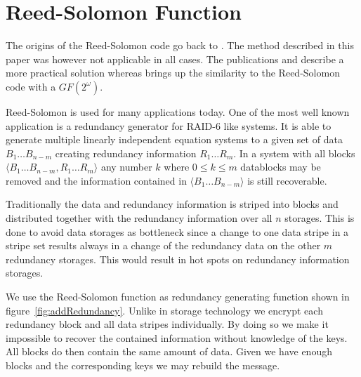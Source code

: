 \documentclass[9pt,journal,compsoc]{IEEEtran}
\begin{document}
%

\newpage
\appendices

\section{Reed-Solomon Function\label{sec:reedSolomon}}
The origins of the Reed-Solomon code go back to \cite{reed1960polynomial}. The method described in this paper was however not applicable in all cases. The publications \cite{karnin1983secret} and \cite{Rabin:1989:EDI:62044.62050} describe a more practical solution whereas \cite{preparata1989holographic} brings up the similarity to the Reed-Solomon code with a $GF(2^\omega)$. 

Reed-Solomon is used for many applications today. One of the most well known application is a redundancy generator for RAID-6 like systems. It is able to generate multiple linearly independent equation systems to a given set of data $B_1\ldots B_{n-m}$ creating redundancy information $R_1\ldots R_m$. In a system with all blocks $\langle B_1\ldots B_{n-m}, R_1\ldots R_m \rangle$ any number $k$ where $0\le k\le m$ datablocks may be removed and the information contained in $\langle B_1\ldots B_{n-m}\rangle$ is still recoverable. 

Traditionally the data and redundancy information is striped into blocks and distributed together with the redundancy information over all $n$ storages. This is done to avoid data storages as bottleneck since a change to one data stripe  in a stripe set results always in a change of the redundancy data on the other $m$ redundancy storages. This would result in hot spots on redundancy information storages.

We use the Reed-Solomon function as redundancy generating function shown in figure~\ref{fig:addRedundancy}. Unlike in storage technology we encrypt each redundancy block and all data stripes individually. By doing so we make it impossible to recover the contained information without knowledge of the keys. All blocks do then contain the same amount of data. Given we have enough blocks and the corresponding keys we may rebuild the message. 
\end{document}

